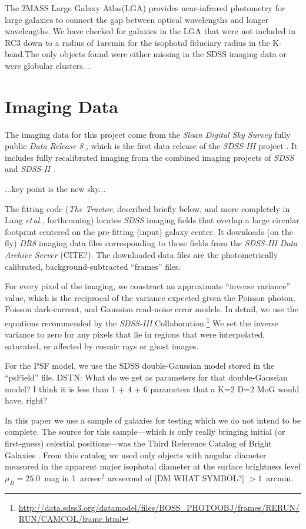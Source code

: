 \documentclass[12pt,preprint,pdftex]{aastex}
\newcommand{\project}[1]{\textsl{#1}}
\newcommand{\units}[1]{\mathrm{#1}}
\renewcommand{\arcmin}{\units{arcmin}}
\newcommand{\foreign}[1]{\emph{#1}}
\newcommand{\etal}{\foreign{et\,al.}}
\begin{document}
The 2MASS Large Galaxy Atlas(LGA) provides near-infrared photometry
for large galaxies to connect the gap between optical wavelengths and
longer wavelengths. We have checked for galaxies in the LGA that were
not included in RC3 down to a radius of $1\arcmin$ for the isophotal
fiduciary radius in the K-band.The only objects found were either
missing in the SDSS imaging data or were globular clusters.
\citep{jarrett03}.


\section{Imaging Data}\label{sec:data}
The imaging data for this project come from the \project{Sloan Digital
  Sky Survey} fully public \project{Data Release 8} \citep{dr8}, which is
the first data release of the \project{SDSS-III} project \citep{sdssiii}.  It
includes fully recalibrated imaging \citep{padmanabhan} from the
combined imaging projects of \project{SDSS} \citep{york}  and
\project{SDSS-II} \citep{sdssii}.

...key point is the new sky...

The fitting code (\project{The Tractor}, described briefly below, and
more completely in Lang \etal, forthcoming) locates \project{SDSS}
imaging fields that overlap a large circular footprint centered on the
pre-fitting (input) galaxy center.  It downloads (on the fly)
\project{DR8} imaging data files corresponding to those fields from
the \project{SDSS-III} \project{Data Archive Server} (CITE?).  The
downloaded data files are the photometrically calibrated,
background-subtracted ``frames'' files.

For every pixel of the imaging, we construct an approximate ``inverse
variance'' value, which is the reciprocal of the variance expected
given the Poisson photon, Poisson dark-current, and Gaussian
read-noise error models.  In detail, we use the equations recommended
by the \project{SDSS-III}
Collaboration.\footnote{\url{http://data.sdss3.org/datamodel/files/BOSS\_PHOTOOBJ/frames/RERUN/RUN/CAMCOL/frame.html}}
We set the inverse variance to zero for any pixels that lie in regions
that were interpolated, saturated, or affected by cosmic rays or ghost
images.

For the PSF model, we use the SDSS double-Gaussian model stored in the
``psField'' file.  DSTN: What do we get as parameters for that
double-Gaussian model?  I think it is less than 1 + 4 + 6 parameters
that a K=2 D=2 MoG would have, right?

In this paper we use a sample of galaxies for testing which we do not
intend to be complete.  The source for this sample---which is only
really bringing initial (or first-guess) celestial positions---was the
Third Reference Catalog of Bright Galaxies \citep{rc3}.  From this
catalog we used only objects with angular diameter measured in the
apparent major isophotal diameter at the surface brightness level
$\mu_B = 25.0$~mag in 1~arcsec$^2$ arcsecond of [DM WHAT SYMBOL?]
$>1$~arcmin.
\end{document}
